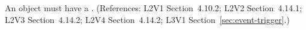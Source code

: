 An \Event object must have a .  (References: L2V1
Section~4.10.2; L2V2 Section~4.14.1; L2V3
Section~4.14.2; L2V4 Section~4.14.2; L3V1 Section~\ref{sec:event-trigger}.)
